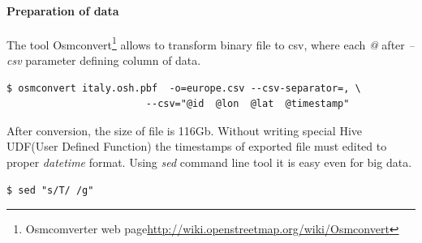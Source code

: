 \documentclass[a4paper,12pt,oneside]{report}
\begin{document}
\paragraph{Preparation of data}
	 The tool Osmconvert\footnote{Osmcomverter web page\url{http://wiki.openstreetmap.org/wiki/Osmconvert}} allows to transform binary file to csv,  where each 	\textit{@} after \textit{--csv} parameter defining column of data.
	\begin{footnotesize}
		\begin{lstlisting}[style=python]
$ osmconvert italy.osh.pbf  -o=europe.csv --csv-separator=, \
						--csv="@id  @lon  @lat  @timestamp"
		\end{lstlisting}
	\end{footnotesize}
 After conversion, the size of file is 116Gb. Without writing special Hive UDF(User Defined Function) the timestamps of exported file must edited to proper \textit{datetime} format. Using \textit{sed} command line tool it is easy even for big data.
	\begin{footnotesize}
		\begin{lstlisting}[style=python]
$ sed "s/T/ /g"
		\end{lstlisting}
	\end{footnotesize}
\end{document}
